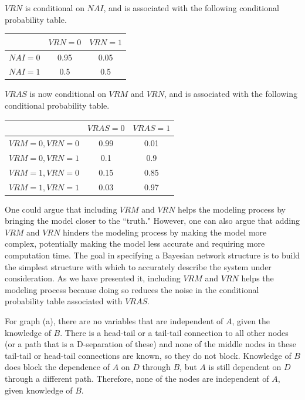 \documentclass[solution, letterpaper]{cs121}
\begin{document}
\begin{empfile}
$VRN$ is conditional on $NAI$, and is associated with the following conditional probability table.
\begin{center}
\begin{tabular}{ c |c c }
   & $VRN = 0$ & $VRN = 1$ \\
   \hline
  $NAI = 0$ & 0.95 & 0.05 \\
  $NAI = 1$ & 0.5 & 0.5 \\
\end{tabular}
\end{center}

$VRAS$ is now conditional on $VRM$ and $VRN$, and is associated with the following conditional probability table.
\begin{center}
\begin{tabular}{ c |c c }
   & $VRAS = 0$ & $VRAS = 1$ \\
   \hline
  $VRM = 0, VRN = 0 $ & 0.99 & 0.01 \\
  $VRM = 0, VRN = 1 $ & 0.1 & 0.9 \\
  $VRM = 1, VRN = 0 $ & 0.15 & 0.85 \\
  $VRM = 1, VRN = 1 $ & 0.03 & 0.97 \\
\end{tabular}
\end{center}

\subproblem %
One could argue that including $VRM$ and $VRN$ helps the modeling process by bringing the model closer to the ``truth." However, one can also argue that adding $VRM$ and $VRN$ hinders the modeling process by making the model more complex, potentially making the model less accurate and requiring more computation time. The goal in specifying a Bayesian network structure is to build the simplest structure with which to accurately describe the system under consideration. As we have presented it, including $VRM$ and $VRN$ helps the modeling process because doing so reduces the noise in the conditional probability table associated with $VRAS$.

\subproblem 
For graph (a), there are no variables that are independent of $A$, given the knowledge of $B$. There is a head-tail or a tail-tail connection to all other nodes (or a path that is a D-separation of these) and none of the middle nodes in these tail-tail or head-tail connections are known, so they do not block. Knowledge of $B$ does block the dependence of $A$ on $D$ through $B$, but $A$ is still dependent on $D$ through a different path. Therefore, none of the nodes are independent of $A$, given knowledge of $B$.\\


\end{empfile}
\end{document}

